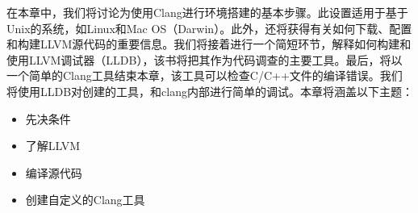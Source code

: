 
在本章中，我们将讨论为使用Clang进行环境搭建的基本步骤。此设置适用于基于Unix的系统，如Linux和Mac OS（Darwin）。此外，还将获得有关如何下载、配置和构建LLVM源代码的重要信息。我们将接着进行一个简短环节，解释如何构建和使用LLVM调试器（LLDB），该书将把其作为代码调查的主要工具。最后，将以一个简单的Clang工具结束本章，该工具可以检查C/C++文件的编译错误。我们将使用LLDB对创建的工具，和clang内部进行简单的调试。本章将涵盖以下主题：

\begin{itemize}
\item
先决条件

\item
了解LLVM

\item
编译源代码

\item
创建自定义的Clang工具
\end{itemize}